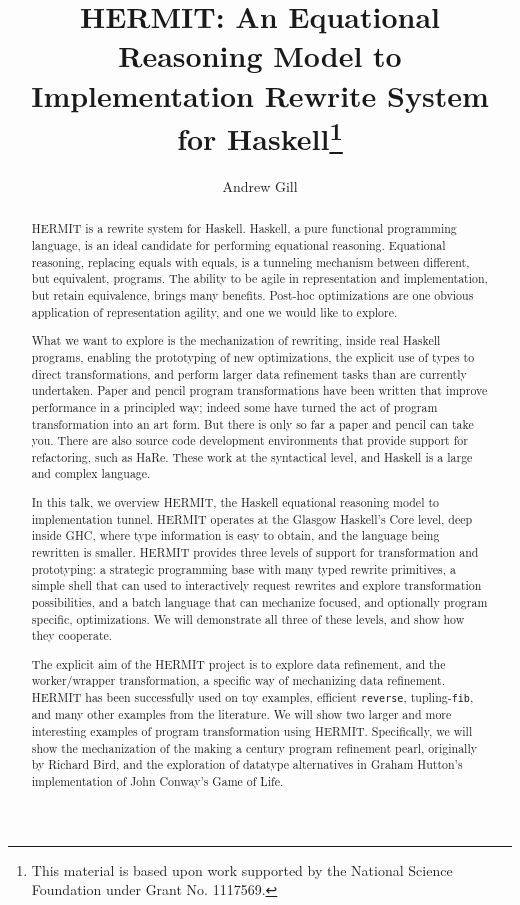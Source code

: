 \documentclass[a4paper,UKenglish]{oasics}
\title{HERMIT: An Equational Reasoning Model to Implementation Rewrite System for Haskell\footnote{This material is based upon work supported by the National Science Foundation under Grant No. 1117569.}}
\author[1]{Andrew Gill}
\affil[1]{Information Technology and Telecommunication Center,\\
Department of Electrical Engineering and Computer Science,\\
The University of Kansas, USA\\
\texttt{andygill@ku.edu}}
\begin{document}
\maketitle

\begin{abstract}
HERMIT is a rewrite system for Haskell.
%
Haskell, a pure functional programming language,
is an ideal candidate for performing equational reasoning.
%
Equational reasoning, replacing equals with equals,
is a tunneling mechanism between different, but equivalent, programs.
%
The ability to be agile in representation and implementation,
but retain equivalence, brings many benefits. Post-hoc 
optimizations are one obvious application of representation
agility, and one we would like to explore.


What we want to explore is the mechanization of rewriting, 
inside real Haskell programs, enabling the prototyping
of new optimizations, the explicit use of types to direct
transformations, and perform larger data refinement tasks
than are currently undertaken.
%
Paper and pencil program transformations have been written
that improve performance in a principled way; indeed some
have turned the act of program transformation into an art form.
But there is only so far a paper and pencil can take you.
%
There are also source code development environments
that provide support for refactoring, such as HaRe.
These work at the syntactical
level, and Haskell is a large and complex language.

In this talk, we overview HERMIT, the Haskell
equational reasoning model to implementation tunnel.
%
HERMIT operates at the Glasgow Haskell's Core level,
deep inside GHC, where type information is easy to
obtain, and the language being rewritten is smaller.
%
HERMIT provides three levels of support for
transformation and prototyping: a strategic programming
base with many typed rewrite primitives, a simple
shell that can used to interactively request rewrites
and explore transformation possibilities, and a batch
language that can mechanize focused, and optionally
program specific, optimizations.
%
We will demonstrate all three of these levels, and show how they cooperate.

The explicit aim of the HERMIT project is to explore data refinement,
and the worker/wrapper transformation, a specific way of mechanizing
data refinement.
%
HERMIT has been successfully used on toy examples, efficient \verb|reverse|,
tupling-\verb|fib|, and many other examples from the literature.
We will show two larger and more interesting examples of program transformation using HERMIT.
Specifically, we will show the mechanization of 
the making a century program refinement pearl, originally by Richard Bird,
and the exploration of datatype alternatives in Graham Hutton's 
implementation of John Conway's Game of Life.
\end{abstract}
\end{document}
